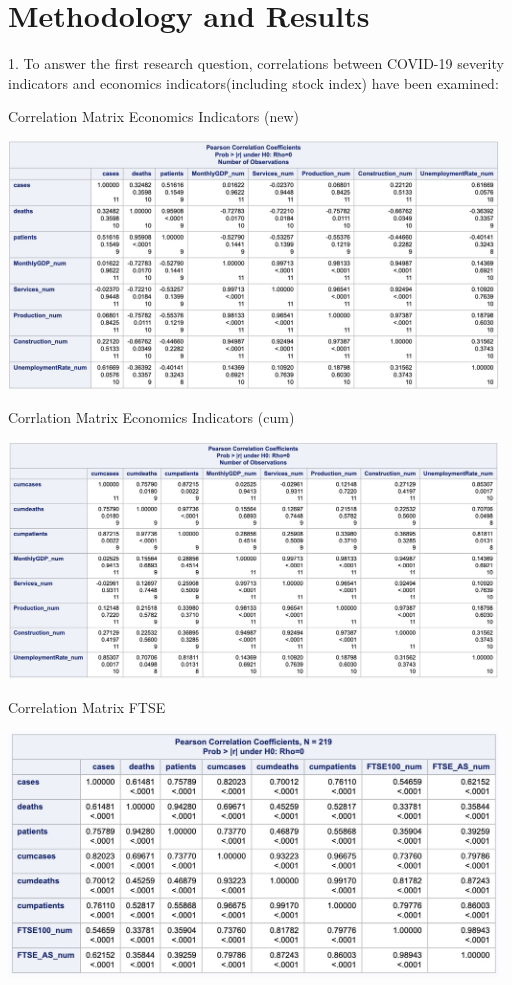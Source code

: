 \documentclass[12pt, a4paper]{report}
\begin{document}
\section{Methodology and Results}
1. To answer the first research question, correlations between COVID-19 severity indicators
and economics indicators(including stock index) have been examined:

\begin{table}[H]
\centering
\caption{Correlation Matrix Economics Indicators (new)}
\includegraphics[width=13cm]{corr_economics_new.jpg}
\end{table}

\begin{table}[H]
\centering
\caption{Corrlation Matrix Economics Indicators (cum)}
\includegraphics[width=13cm]{corr_economics_cum.jpg}
\end{table}

\begin{table}[H]
\centering
\caption{Correlation Matrix FTSE}
\includegraphics[width=13cm]{corr_stock.jpg}
\end{table}
\hspace*{\fill}
\end{document}
